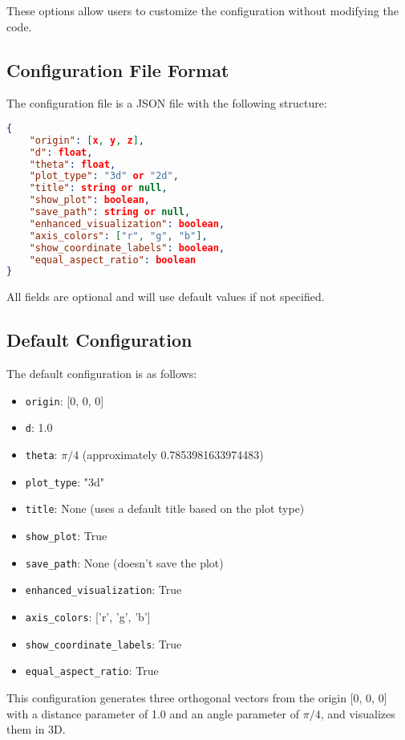 These options allow users to customize the configuration without modifying the code.

\subsection{Configuration File Format}

The configuration file is a JSON file with the following structure:

\begin{lstlisting}[language=JSON]
{
    "origin": [x, y, z],
    "d": float,
    "theta": float,
    "plot_type": "3d" or "2d",
    "title": string or null,
    "show_plot": boolean,
    "save_path": string or null,
    "enhanced_visualization": boolean,
    "axis_colors": ["r", "g", "b"],
    "show_coordinate_labels": boolean,
    "equal_aspect_ratio": boolean
}
\end{lstlisting}

All fields are optional and will use default values if not specified.

\subsection{Default Configuration}

The default configuration is as follows:

\begin{itemize}
    \item \texttt{origin}: [0, 0, 0]
    \item \texttt{d}: 1.0
    \item \texttt{theta}: $\pi/4$ (approximately 0.7853981633974483)
    \item \texttt{plot\_type}: "3d"
    \item \texttt{title}: None (uses a default title based on the plot type)
    \item \texttt{show\_plot}: True
    \item \texttt{save\_path}: None (doesn't save the plot)
    \item \texttt{enhanced\_visualization}: True
    \item \texttt{axis\_colors}: ['r', 'g', 'b']
    \item \texttt{show\_coordinate\_labels}: True
    \item \texttt{equal\_aspect\_ratio}: True
\end{itemize}

This configuration generates three orthogonal vectors from the origin [0, 0, 0] with a distance parameter of 1.0 and an angle parameter of $\pi/4$, and visualizes them in 3D.
